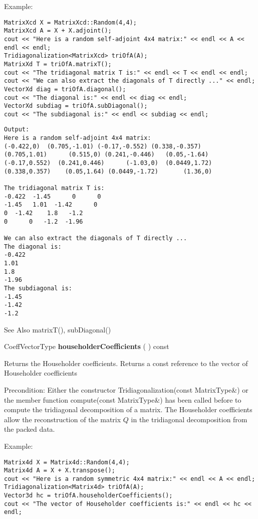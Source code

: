 Example:
\begin{lstlisting}
MatrixXcd X = MatrixXcd::Random(4,4);
MatrixXcd A = X + X.adjoint();
cout << "Here is a random self-adjoint 4x4 matrix:" << endl << A << endl << endl;
Tridiagonalization<MatrixXcd> triOfA(A);
MatrixXd T = triOfA.matrixT();
cout << "The tridiagonal matrix T is:" << endl << T << endl << endl;
cout << "We can also extract the diagonals of T directly ..." << endl;
VectorXd diag = triOfA.diagonal();
cout << "The diagonal is:" << endl << diag << endl; 
VectorXd subdiag = triOfA.subDiagonal();
cout << "The subdiagonal is:" << endl << subdiag << endl;
\end{lstlisting}

\begin{verbatim}
Output:
Here is a random self-adjoint 4x4 matrix:
(-0.422,0)  (0.705,-1.01) (-0.17,-0.552) (0.338,-0.357)
(0.705,1.01)      (0.515,0) (0.241,-0.446)   (0.05,-1.64)
(-0.17,0.552)  (0.241,0.446)      (-1.03,0)  (0.0449,1.72)
(0.338,0.357)    (0.05,1.64) (0.0449,-1.72)       (1.36,0)

The tridiagonal matrix T is:
-0.422  -1.45      0      0
-1.45   1.01  -1.42      0
0  -1.42    1.8   -1.2
0      0   -1.2  -1.96

We can also extract the diagonals of T directly ...
The diagonal is:
-0.422
1.01
1.8
-1.96
The subdiagonal is:
-1.45
-1.42
-1.2
\end{verbatim}


See Also
matrixT(), subDiagonal() 


\vspace{0.3cm}
CoeffVectorType \textbf{householderCoefficients}  ( )  const 


Returns the Householder coefficients. 
Returns a const reference to the vector of Householder coefficients

Precondition: Either the constructor Tridiagonalization(const MatrixType\&) or the member function compute(const MatrixType\&) has been called before to compute the tridiagonal decomposition of a matrix.
The Householder coefficients allow the reconstruction of the matrix $Q$ in the tridiagonal decomposition from the packed data.


Example:
\begin{lstlisting}
Matrix4d X = Matrix4d::Random(4,4);
Matrix4d A = X + X.transpose();
cout << "Here is a random symmetric 4x4 matrix:" << endl << A << endl;
Tridiagonalization<Matrix4d> triOfA(A);
Vector3d hc = triOfA.householderCoefficients();
cout << "The vector of Householder coefficients is:" << endl << hc << endl;
\end{lstlisting}

